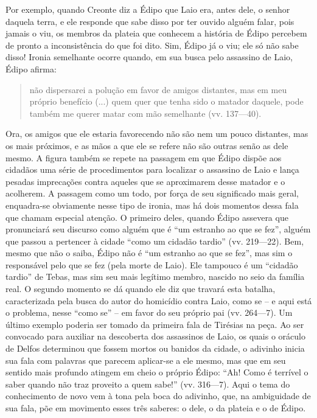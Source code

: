 Por exemplo, quando Creonte diz a Édipo que Laio era, antes dele, o
senhor daquela terra, e ele responde que sabe disso por ter ouvido
alguém falar, pois jamais o viu, os membros da plateia que conhecem a
história de Édipo percebem de pronto a inconsistência do que foi dito.
Sim, Édipo já o viu; ele só não sabe disso! Ironia semelhante ocorre
quando, em sua busca pelo assassino de Laio, Édipo afirma: 

\begin{quote}
não dispersarei a polução em favor de amigos distantes, mas em meu próprio
benefício (...) quem quer que tenha sido o matador daquele, pode
também me querer matar com mão semelhante (vv. 137---40). 
\end{quote}

Ora, os amigos que ele estaria favorecendo não são nem um pouco distantes, mas os mais
próximos, e as mãos a que ele se refere não são outras senão as dele
mesmo. A figura também se repete na passagem em que Édipo dispõe aos
cidadãos uma série de procedimentos para localizar o assassino de Laio e
lança pesadas imprecações contra aqueles que se aproximarem desse
matador e o acolherem. A passagem como um todo, por força de seu
significado mais geral, enquadra-se obviamente nesse tipo de ironia, mas
há dois momentos dessa fala que chamam especial atenção. O primeiro
deles, quando Édipo assevera que pronunciará seu discurso como alguém
que é ``um estranho ao que se fez'', alguém que passou a pertencer à
cidade ``como um cidadão tardio'' (vv. 219---22). Bem, mesmo que não o
saiba, Édipo não é ``um estranho ao que se fez'', mas sim o responsável
pelo que se fez (pela morte de Laio). Ele tampouco é um ``cidadão
tardio'' de Tebas, mas sim seu mais legítimo membro, nascido no seio da
família real. O segundo momento se dá quando ele diz que travará esta
batalha, caracterizada pela busca do autor do homicídio contra Laio,
como se -- e aqui está o problema, nesse ``como se'' -- em favor do seu
próprio pai (vv. 264---7). Um último exemplo poderia ser tomado da
primeira fala de Tirésias na peça. Ao ser convocado para auxiliar na
descoberta dos assassinos de Laio, os quais o oráculo de Delfos
determinou que fossem mortos ou banidos da cidade, o adivinho inicia sua
fala com palavras que parecem aplicar-se a ele mesmo, mas que em seu
sentido mais profundo atingem em cheio o próprio Édipo: ``Ah! Como é
terrível o saber quando não traz proveito a quem sabe!'' (vv. 316---7).
Aqui o tema do conhecimento de novo vem à tona pela boca do adivinho,
que, na ambiguidade de sua fala, põe em movimento esses três saberes: o
dele, o da plateia e o de Édipo.

